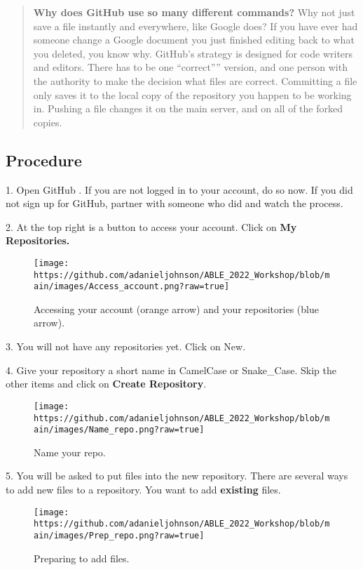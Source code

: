 \documentclass[
]{article}
\begin{document}
\begin{quote}
\textbf{Why does GitHub use so many different commands?} Why not just
save a file instantly and everywhere, like Google does? If you have ever
had someone change a Google document you just finished editing back to
what you deleted, you know why. GitHub's strategy is designed for code
writers and editors. There has to be one ``correct'''' version, and one
person with the authority to make the decision what files are correct.
Committing a file only saves it to the local copy of the repository you
happen to be working in. Pushing a file changes it on the main server,
and on all of the forked copies.
\end{quote}

\hypertarget{procedure-2}{%
\subsection{Procedure}\label{procedure-2}}

1. Open GitHub . If you are not logged in to your account, do so now. If
you did not sign up for GitHub, partner with someone who did and watch
the process.

2. At the top right is a button to access your account. Click on
\textbf{My Repositories.}

\begin{figure}
\centering
\texttt{[image: https://github.com/adanieljohnson/ABLE\_2022\_Workshop/blob/main/images/Access\_account.png?raw=true]}
\caption{Accessing your account (orange arrow) and your repositories
(blue arrow).}
\end{figure}

3. You will not have any repositories yet. Click on New.

4. Give your repository a short name in CamelCase or Snake\_Case. Skip
the other items and click on \textbf{Create Repository}.

\begin{figure}
\centering
\texttt{[image: https://github.com/adanieljohnson/ABLE\_2022\_Workshop/blob/main/images/Name\_repo.png?raw=true]}
\caption{Name your repo.}
\end{figure}

5. You will be asked to put files into the new repository. There are
several ways to add new files to a repository. You want to add
\textbf{existing} files.

\begin{figure}
\centering
\texttt{[image: https://github.com/adanieljohnson/ABLE\_2022\_Workshop/blob/main/images/Prep\_repo.png?raw=true]}
\caption{Preparing to add files.}
\end{figure}
\end{document}
